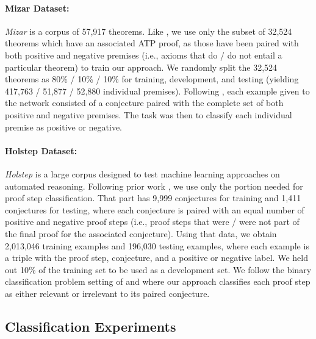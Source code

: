 \documentclass{article}
\begin{document}
\paragraph{Mizar Dataset: } \emph{Mizar} \cite{mizar40for40} is a  corpus of 57,917 theorems. Like \cite{irving2016deepmath,olvsak2019property,kucik2018premise}, we use only the subset of 32,524 theorems which have an associated ATP proof, as those have been paired with both positive and negative premises (i.e., axioms that do / do not entail a particular theorem) to train our approach. We randomly split the 32,524 theorems as 80\% / 10\% / 10\% for training, development, and testing (yielding 417,763 / 51,877 / 52,880 individual premises). Following \cite{olvsak2019property}, each example given to the network consisted of a conjecture paired with the complete set of both positive and negative premises. The task was then to classify each individual premise as positive or negative.



\paragraph{Holstep Dataset: } \emph{Holstep} \cite{kaliszyk2017holstep} is a large corpus designed to test machine learning approaches on automated reasoning. Following prior work \cite{kaliszyk2017holstep,wang2017premise}, we use only the portion needed for proof step classification. That part has 9,999 conjectures for training and 1,411 conjectures for testing, where each conjecture is paired with an equal number of positive and negative proof steps (i.e., proof steps that were / were not part of the final proof for the associated conjecture). Using that data, we obtain 2,013,046 training examples and 196,030 testing examples, where each example is a triple with the proof step, conjecture, and a positive or negative label. We held out 10\% of the training set to be used as a development set. We follow the binary classification problem setting of \cite{wang2017premise} and \cite{kaliszyk2017holstep} where our approach classifies each proof step as either relevant or irrelevant to its paired conjecture.

 


\subsection{Classification Experiments}
\label{sec:classification}
\end{document}
